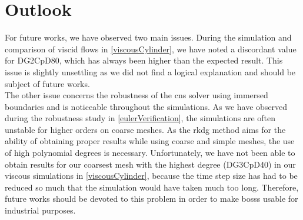 \section{Outlook}
For future works, we have observed two main issues. During the simulation and comparison of viscid flows in \cref{viscousCylinder}, we have noted a discordant value for DG2CpD80, which has always been higher than the expected result. This issue is slightly unsettling as we did not find a logical explanation and should be subject of future works. \\\indent
The other issue concerns the robustness of the \gls{cns} solver using immersed boundaries and is noticeable throughout the simulations. As we have observed during the robustness study in \cref{eulerVerification}, the simulations are often unstable for higher orders on coarse meshes. As the \gls{rkdg} method aims for the ability of obtaining proper results while using coarse and simple meshes, the use of high polynomial degrees is necessary. Unfortunately, we have not been able to obtain results for our coarsest mesh with the highest degree (DG3CpD40) in our viscous simulations in \cref{viscousCylinder}, because the time step size has had to be reduced so much that the simulation would have taken much too long. Therefore, future works should be devoted to this problem in order to make \gls{bosss} usable for industrial purposes. 


